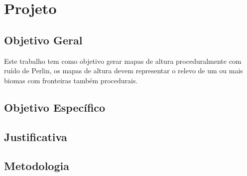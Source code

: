 \chapter{Projeto}

\section{Objetivo Geral}
Este trabalho tem como objetivo gerar mapas de altura proceduralmente com ruído 
de Perlin, os mapas de altura devem representar o relevo de um ou mais biomas
com fronteiras também procedurais.

\section{Objetivo Específico}


\section{Justificativa}

\section{Metodologia}